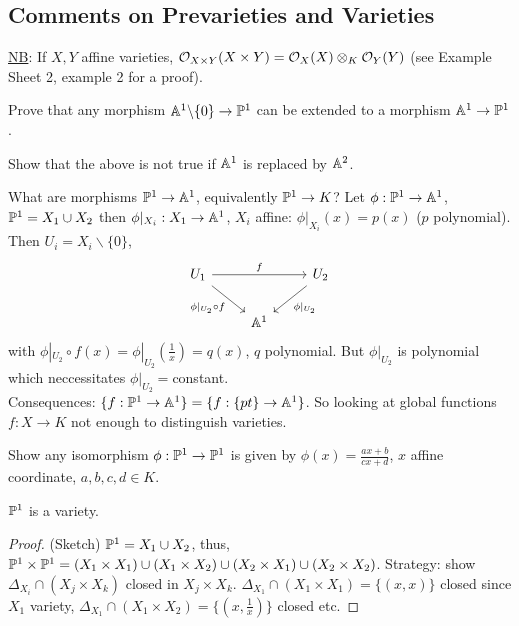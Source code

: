 \documentclass[a4paper,11pt]{article}
\begin{document}
			{\color{gray}\subsection*{Comments on Prevarieties and Varieties}
			
				\noindent\underline{NB}: If $X,Y$ affine varieties, $\O_{X\times Y}(X\times Y)=\O_X(X)\otimes_K\O_Y(Y)$ (see Example Sheet 2, example 2 for a proof).

				\begin{exc}
					Prove that any morphism $\AA^1\backslash\{0\}\rightarrow\P^1$ can be extended to a morphism $\AA^1\rightarrow\P^1$.
				\end{exc}

				\begin{exc}
					Show that the above is not true if $\AA^1$ is replaced by $\AA^2$.
				\end{exc}

				What are morphisms $\P^1\rightarrow\AA^1$, equivalently  $\P^1\rightarrow K$? Let $\phi:\P^1\rightarrow\AA^1$, $\P^1=X_1\cup X_2$ then $\phi|_{X_i}:X_1\rightarrow\AA^1$, $X_i$ affine: $\phi|_{X_i}(x)=p(x)$ ($p$ polynomial). Then $U_i=X_i\backslash\{0\}$,
				\begin{equation*}
					\begin{tikzcd}
						U_1\ar[rr,"f"]\ar[rd,"\phi|_{U_2}\circ f"'] & & \ar[ld,"\phi|_{U_2}"]U_2\\& \AA^1 &
					\end{tikzcd}
				\end{equation*}
				with $\phi|_{U_2}\circ f(x)=\phi|_{U_2}(\frac{1}{x})=q(x)$, $q$ polynomial. But $\phi|_{U_2}$ is polynomial which neccessitates $\phi|_{U_2}=$constant.
				\\

				\noindent Consequences: $\{f:\P^1\rightarrow\AA^1\}=\{f:\{pt\}\rightarrow\AA^1\}$. So looking at global functions $f:X\rightarrow K$ not enough to distinguish varieties.

				\begin{exc}
					Show any isomorphism $\phi:\P^1\rightarrow\P^1$ is given by $\phi(x)=\frac{ax+b}{cx+d}$, $x$ affine coordinate, $a,b,c,d\in K$.
				\end{exc}

				\begin{prop}
					$\P^1$ is a variety.
				\end{prop}
				\begin{proof}\renewcommand{\qedsymbol}{}
					(Sketch) $\P^1=X_1\cup X_2$, thus, $\P^1\times\P^1=(X_1\times X_1)\cup(X_1\times X_2)\cup(X_2\times X_1)\cup(X_2\times X_2)$. Strategy: show $\Delta_{X_i}\cap(X_j\times X_k)$ closed in $X_j\times X_k$. $\Delta_{X_1}\cap(X_1\times X_1)=\{(x,x)\}$ closed since $X_1$ variety, $\Delta_{X_1}\cap(X_1\times X_2)=\{(x,\frac{1}{x})\}$ closed etc.
				\end{proof}\renewcommand{\qedsymbol}{$\square$}

}
\end{document}
